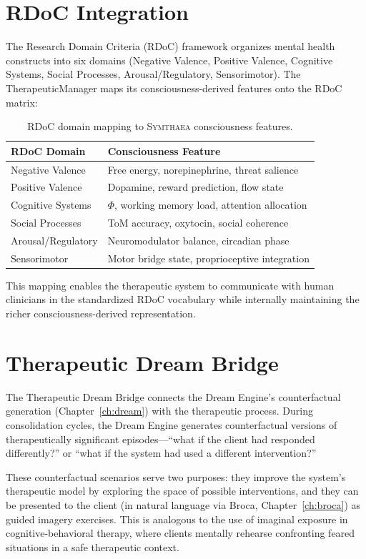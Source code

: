 \documentclass[12pt]{book}
\newcommand{\symthaea}{\textsc{Symthaea}}
\begin{document}
\section{RDoC Integration}

The Research Domain Criteria (RDoC) framework organizes mental health constructs into six domains (Negative Valence, Positive Valence, Cognitive Systems, Social Processes, Arousal/Regulatory, Sensorimotor). The TherapeuticManager maps its consciousness-derived features onto the RDoC matrix:

\begin{table}[htbp]
\centering
\caption{RDoC domain mapping to \symthaea{} consciousness features.}
\label{tab:rdoc-mapping}
\begin{tabular}{@{}ll@{}}
\toprule
\textbf{RDoC Domain} & \textbf{Consciousness Feature} \\
\midrule
Negative Valence   & Free energy, norepinephrine, threat salience \\
Positive Valence   & Dopamine, reward prediction, flow state \\
Cognitive Systems  & $\Phi$, working memory load, attention allocation \\
Social Processes   & ToM accuracy, oxytocin, social coherence \\
Arousal/Regulatory & Neuromodulator balance, circadian phase \\
Sensorimotor       & Motor bridge state, proprioceptive integration \\
\bottomrule
\end{tabular}
\end{table}

This mapping enables the therapeutic system to communicate with human clinicians in the standardized RDoC vocabulary while internally maintaining the richer consciousness-derived representation.

\section{Therapeutic Dream Bridge}

The Therapeutic Dream Bridge connects the Dream Engine's counterfactual generation (Chapter~\ref{ch:dream}) with the therapeutic process. During consolidation cycles, the Dream Engine generates counterfactual versions of therapeutically significant episodes---``what if the client had responded differently?'' or ``what if the system had used a different intervention?''

These counterfactual scenarios serve two purposes: they improve the system's therapeutic model by exploring the space of possible interventions, and they can be presented to the client (in natural language via Broca, Chapter~\ref{ch:broca}) as guided imagery exercises. This is analogous to the use of imaginal exposure in cognitive-behavioral therapy, where clients mentally rehearse confronting feared situations in a safe therapeutic context.
\end{document}
